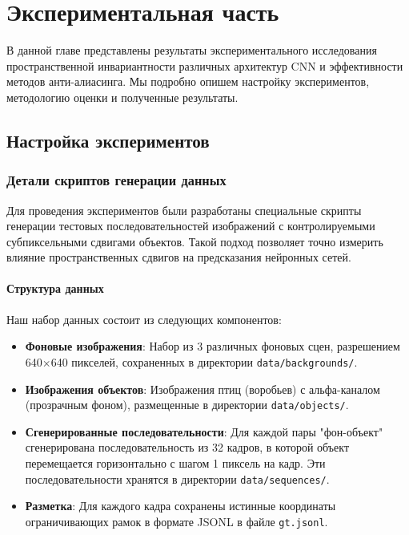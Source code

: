 \chapter{Экспериментальная часть} \label{experiments}

В данной главе представлены результаты экспериментального исследования пространственной инвариантности различных архитектур CNN и эффективности методов анти-алиасинга. Мы подробно опишем настройку экспериментов, методологию оценки и полученные результаты.

\section{Настройка экспериментов}
\label{experiments:setup}

\subsection{Детали скриптов генерации данных}
\label{experiments:setup:data_generation}

Для проведения экспериментов были разработаны специальные скрипты генерации тестовых последовательностей изображений с контролируемыми субпиксельными сдвигами объектов. Такой подход позволяет точно измерить влияние пространственных сдвигов на предсказания нейронных сетей.

\subsubsection{Структура данных}
\label{experiments:setup:data_generation:structure}

Наш набор данных состоит из следующих компонентов:

\begin{itemize}
    \item \textbf{Фоновые изображения}: Набор из 3 различных фоновых сцен, разрешением 640×640 пикселей, сохраненных в директории \texttt{data/backgrounds/}.
    
    \item \textbf{Изображения объектов}: Изображения птиц (воробьев) с альфа-каналом (прозрачным фоном), размещенные в директории \texttt{data/objects/}.
    
    \item \textbf{Сгенерированные последовательности}: Для каждой пары "фон-объект" сгенерирована последовательность из 32 кадров, в которой объект перемещается горизонтально с шагом 1 пиксель на кадр. Эти последовательности хранятся в директории \texttt{data/sequences/}.
    
    \item \textbf{Разметка}: Для каждого кадра сохранены истинные координаты ограничивающих рамок в формате JSONL в файле \texttt{gt.jsonl}.
\end{itemize}


